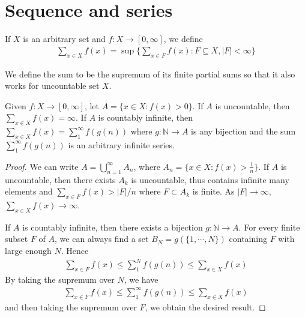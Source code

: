 \section{Sequence and series} \label{sec:}

\begin{definition}
 \normalfont If $X$ is an arbitrary set and $f: X \to [0,\infty]$, we define 
 \begin{align*}
    \sum\limits_{x \in X} f(x) = \sup_{} \{ \sum\limits_{x \in F} f(x) : F \subseteq X , |F| < \infty  \}
 \end{align*}
\end{definition}

\begin{remark}
We define the sum to be the supremum of its finite partial sums so that it also works for uncountable set $X$.
\end{remark}

\begin{proposition} \label{1.2.1}
 \normalfont Given $f: X \to [0, \infty]$, let $A = \{ x \in X : f(x) > 0 \}$. If $A$ is uncountable, then $\sum_{x \in X}f(x) = \infty$. If $A$ is countably infinite, then $\sum_{x \in X}f(x) = \sum_{1}^{\infty}f(g(n))$ where $g: \mathbb{N} \to A$ is any bijection and the sum $\sum_{1}^{\infty}f(g(n))$ is an arbitrary infinite series.
\end{proposition}
\begin{proof}
    We can write $A = \bigcup_{n = 1}^{\infty} A_n$, where $A_n = \{  x \in X : f(x) > \frac{1}{n} \}$. If $A$ is uncountable, then there exists $A_k$ is uncountable, thus contains infinite many elements and $\sum_{x \in F} f(x) > |F|/n$ where $F \subset A_k$ is finite. As $|F| \to \infty$, $\sum_{x \in X}f(x) \to \infty$. 
    
    If $A$ is countably infinite, then there exists a bijection $g: \mathbb{N} \to A$. For every finite subset $F$ of $A$, we can always find a set $B_N = g(\{ 1,\cdots ,N \})$ containing $F$ with large enough $N$. Hence
    \begin{align*}
        \sum\limits_{x \in F}^{} f(x) \le \sum\limits_{1}^{N} f(g(n)) \le \sum\limits_{x \in X}^{} f(x)
    \end{align*}
    By taking the supremum over $N$, we have
    \begin{align*}
        \sum\limits_{x \in F}^{} f(x) \le \sum\limits_{1}^{\infty} f(g(n)) \le \sum\limits_{x \in X}^{} f(x)
    \end{align*}
    and then taking the supremum over $F$, we obtain the desired result.
\end{proof}


